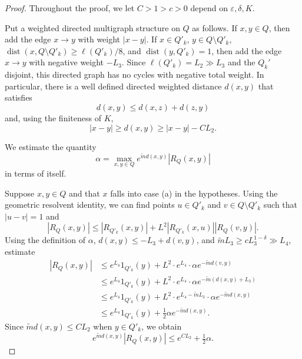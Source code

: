 \documentclass{amsart}
\numberwithin{equation}{section}
\numberwithin{figure}{section}
\newcommand{\ep}{\varepsilon}
\newcommand{\id}{1}
\newcommand{\dist}{\operatorname{dist}}
\begin{document}
\begin{proof}
Throughout the proof, we let $C > 1 > c > 0$ depend on $\ep, \delta, K$.

Put a weighted directed multigraph structure on $Q$ as follows.  If $x, y \in Q$, then add the edge $x \to y$ with weight $|x-y|$.  If $x \in Q'_k$, $y \in Q \setminus Q'_k$, $\dist(x, Q \setminus Q'_k) \geq \ell(Q'_k)/8$, and $\dist(y,Q'_k) = 1$, then add the edge $x \to y$ with negative weight $- L_3$.  Since $\ell(Q'_k) = L_2 \gg L_3$ and the $Q_k'$ disjoint, this directed graph has no cycles with negative total weight.  In particular, there is a well defined directed weighted distance $d(x,y)$ that satisfies
\begin{equation*}
d(x,y) \leq d(x,z) + d(z,y)
\end{equation*}
and, using the finiteness of $K$, 
\begin{equation*}
|x-y| \geq d(x,y) \geq |x-y| - C L_2.
\end{equation*}

We estimate the quantity
\begin{equation*}
\alpha = \max_{x,y \in Q} e^{\tilde m d(x,y)} |R_Q(x,y)|
\end{equation*}
in terms of itself.

Suppose $x, y \in Q$ and that $x$ falls into case (a) in the hypotheses.  Using the geometric resolvent identity, we can find points $u \in Q'_k$ and $v \in  Q \setminus Q'_k$ such that $|u - v| = 1$ and 
\begin{equation*}
|R_Q(x,y)| \leq |R_{Q'_k}(x,y)| + L^2 |R_{Q'_k}(x,u)| |R_Q(v,y)|.
\end{equation*}
Using the definition of $\alpha$, $d(x,y) \leq -L_3 + d(v,y)$, and $\tilde m L_3 \geq c L_3^{1-\delta} \gg L_4$, estimate
\begin{equation*}
\begin{aligned}
|R_Q(x,y)|
& \leq e^{L_4} \id_{Q'_k}(y) + L^2 \cdot e^{L_4} \cdot \alpha e^{-\tilde m d(v,y)} \\
& \leq e^{L_4} \id_{Q'_k}(y) + L^2 \cdot e^{L_4} \cdot \alpha e^{-\tilde m (d(x,y) + L_3)} \\
& \leq e^{L_4} \id_{Q'_k}(y) + L^2 \cdot e^{L_4 - \tilde m L_3} \cdot \alpha e^{-\tilde m d(x,y)} \\
& \leq e^{L_4} \id_{Q'_k}(y) + \tfrac12 \alpha e^{-\tilde m d(x,y)}.
\end{aligned}
\end{equation*}
Since $\tilde m d(x,y) \leq C L_2$ when $y \in Q'_k$, we obtain
\begin{equation*}
e^{\tilde m d(x,y)} |R_Q(x,y)| \leq e^{C L_2} + \tfrac12 \alpha.
\end{equation*}


\end{proof}
\end{document}
